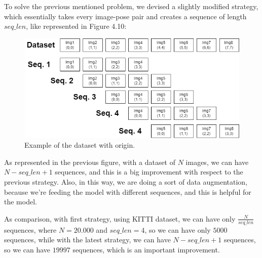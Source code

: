 To solve the previous mentioned problem, we devised a slightly modified strategy, which essentially takes every image-pose pair and creates a sequence of length $seq\_len$, like represented in Figure 4.10:
\begin{figure}[H]
    \centering
    \includegraphics[width=\textwidth]{images/4_2_split_traj_2}
    \caption{Example of the dataset with origin.}
    \label{fig:example-of-dataset-with-origin-2}
\end{figure}
As represented in the previous figure, with a dataset of $N$ images, we can have $N - seq\_len +1 $ sequences, and this is a big improvement with respect to the previous strategy.
Also, in this way, we are doing a sort of data augmentation, because we're feeding the model with different sequences, and this is helpful for the model.

As comparison, with first strategy, using KITTI dataset, we can have only $\frac{N}{seq\_len}$ sequences, where $N = 20.000$ and $seq\_len = 4$, so we can have only $5000$ sequences, while with the latest strategy, we can have $N - seq\_len +1$ sequences, so we can have $19997$ sequences, which is an important improvement.
